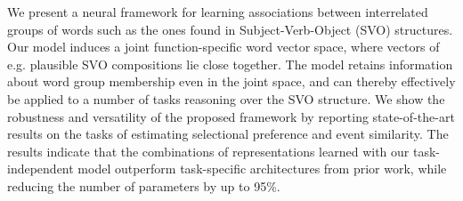 We present a neural framework for learning associations between interrelated groups of words such as the ones found in Subject-Verb-Object (SVO) structures. Our model induces a joint function-specific word vector space, where vectors of e.g. plausible SVO compositions lie close together. The model retains information about word group membership even in the joint space, and can thereby effectively be applied to a number of tasks reasoning over the SVO structure. We show the robustness and versatility of the proposed framework by reporting state-of-the-art results on the tasks of estimating selectional preference and event similarity. The results indicate that the combinations of representations learned with our task-independent model outperform task-specific architectures from prior work, while reducing the number of parameters by up to 95\%.
